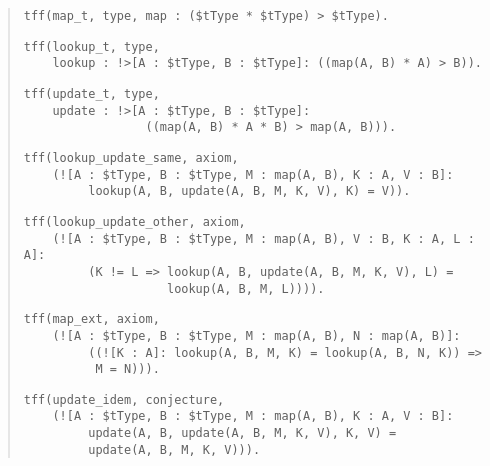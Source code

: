 \begin{quote}
\verb+tff(map_t, type, map : ($tType * $tType) > $tType).+
\par\medskip
\verb+tff(lookup_t, type,+\\
\verb+    lookup : !>[A : $tType, B : $tType]: ((map(A, B) * A) > B)).+\kern-10mm
\par\medskip
\verb+tff(update_t, type,+\\
\verb+    update : !>[A : $tType, B : $tType]:+\\
\verb+                 ((map(A, B) * A * B) > map(A, B))).+
\par\medskip
\verb+tff(lookup_update_same, axiom,+\\
\verb+    (![A : $tType, B : $tType, M : map(A, B), K : A, V : B]:+\\
\verb+         lookup(A, B, update(A, B, M, K, V), K) = V)).+
\par\medskip
\verb+tff(lookup_update_other, axiom,+\\
\verb+    (![A : $tType, B : $tType, M : map(A, B), V : B, K : A, L : A]:+\kern-10mm\\
\verb+         (K != L => lookup(A, B, update(A, B, M, K, V), L) =+\\
\verb+                    lookup(A, B, M, L)))).+
\par\smallskip
\verb+tff(map_ext, axiom,+\\
\verb+    (![A : $tType, B : $tType, M : map(A, B), N : map(A, B)]:+\\
\verb+         ((![K : A]: lookup(A, B, M, K) = lookup(A, B, N, K)) =>+\kern-10mm\\
\verb+          M = N))).+
\par\medskip
\verb+tff(update_idem, conjecture,+\\
\verb+    (![A : $tType, B : $tType, M : map(A, B), K : A, V : B]:+\\
\verb+         update(A, B, update(A, B, M, K, V), K, V) =+\\
\verb+         update(A, B, M, K, V))).+
\end{quote}
